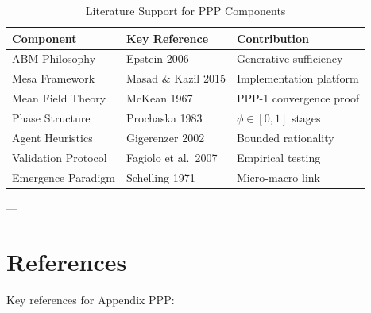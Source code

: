 \begin{table}[htbp]
\centering
\caption{Literature Support for PPP Components}
\label{tab:ppp-literature}
\renewcommand{\arraystretch}{1.2}
\small
\begin{tabular}{@{}lll@{}}
\toprule
\textbf{Component} & \textbf{Key Reference} & \textbf{Contribution} \\
\midrule
ABM Philosophy & Epstein 2006 & Generative sufficiency \\
Mesa Framework & Masad \& Kazil 2015 & Implementation platform \\
Mean Field Theory & McKean 1967 & PPP-1 convergence proof \\
Phase Structure & Prochaska 1983 & $\phi \in [0,1]$ stages \\
Agent Heuristics & Gigerenzer 2002 & Bounded rationality \\
Validation Protocol & Fagiolo et al.~2007 & Empirical testing \\
Emergence Paradigm & Schelling 1971 & Micro-macro link \\
\bottomrule
\end{tabular}
\end{table}

---

\section*{References}

\nocite{bcm_master}

Key references for Appendix PPP:

